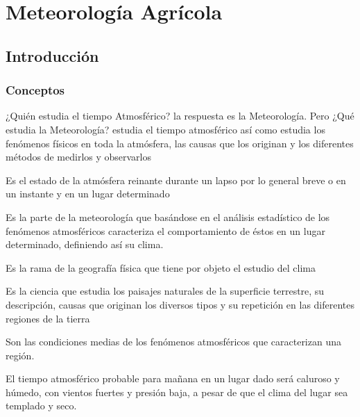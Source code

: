 \chapter{Meteorología Agrícola}

\section{Introducción}
\subsection{Conceptos}
¿Quién estudia el tiempo Atmosférico? la respuesta es la Meteorología. Pero ¿Qué estudia la Meteorología? estudia el tiempo atmosférico así como estudia los fenómenos físicos en toda la atmósfera, las causas que los originan y los diferentes métodos de medirlos y observarlos
\begin{definition}
Es el estado de la atmósfera reinante durante un lapso por lo general breve o en un instante y en un lugar determinado
\end{definition}

\begin{definition}[Climatología]
    Es la parte de la meteorología que basándose en el análisis estadístico de los fenómenos atmosféricos caracteriza el comportamiento de éstos en un lugar determinado, definiendo así su clima.

    Es la rama de la geografía física que tiene por objeto el estudio del clima
\end{definition}

\begin{definition}
    Es la ciencia que estudia los paisajes naturales de la superficie terrestre, su descripción, causas que originan los diversos tipos y su repetición en las diferentes regiones de la tierra
\end{definition}

\begin{definition}[Clima]
    Son las condiciones medias de los fenómenos atmosféricos que caracterizan una región.
\end{definition}

\begin{example}
El tiempo atmosférico probable para mañana en un lugar dado será caluroso y húmedo, con vientos fuertes y presión baja, a pesar de que el clima del lugar sea templado y seco.
\end{example}

